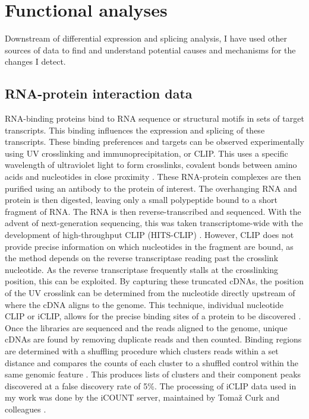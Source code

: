 \section{Functional analyses}

Downstream of differential expression and splicing analysis, I have used other sources of data to find and understand potential causes and mechanisms for the changes I detect.

\subsection{RNA-protein interaction data}

RNA-binding proteins bind to RNA sequence or structural motifs in sets of target transcripts.
This binding influences the expression and splicing of these transcripts.
These binding preferences and targets can be observed experimentally using UV crosslinking and immunoprecipitation, or CLIP. 
This uses a specific wavelength of ultraviolet light to form crosslinks, covalent bonds between amino acids and nucleotides in close proximity \citep{Ule2003}. 
These RNA-protein complexes are then purified using an antibody to the protein of interest.
The overhanging RNA and protein is then digested, leaving only a small polypeptide bound to a short fragment of RNA.
The RNA is then reverse-transcribed and sequenced.
With the advent of next-generation sequencing, this was taken transcriptome-wide with the development of high-throughput CLIP (HITS-CLIP) \citep{Licatalosi2008}.
However, CLIP does not provide precise information on which nucleotides in the fragment are bound, as the method depends on the reverse transcriptase reading past the crosslink nucleotide.
As the reverse transcriptase frequently stalls at the crosslinking position, this can be exploited.
By capturing these truncated cDNAs, the position of the UV crosslink can be determined from the nucleotide directly upstream of where the cDNA aligns to the genome.
This technique, individual nucleotide CLIP or iCLIP, allows for the precise binding sites of a protein to be discovered \citep{Konig2010,Huppertz2014-ip}.
Once the libraries are sequenced and the reads aligned to the genome, unique cDNAs are found by removing duplicate reads and then counted. 
Binding regions are determined with a shuffling procedure which clusters reads within a set distance and compares the counts of each cluster to a shuffled control within the same genomic feature \citep{Wang2010}.
This produces lists of clusters and their component peaks discovered at a false discovery rate of 5\%.
The processing of iCLIP data used in my work was done by the iCOUNT server, maintained by Toma{\v{z}} Curk and colleagues \citep{Curk2016}.

